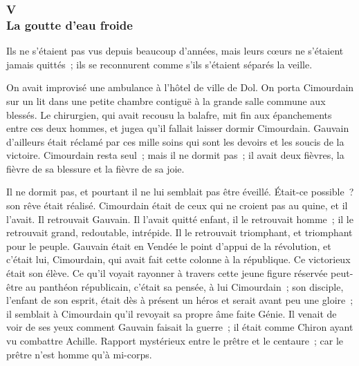 \documentclass[french,twoside]{book} %
\begin{document}
 \subsubsection[{V. La goutte d’eau froide}]{V \\
La goutte d’eau froide}
\label{p3l2c5}
\noindent Ils ne s’étaient pas vus depuis beaucoup d’années, mais leurs cœurs ne s’étaient jamais quittés ; ils se reconnurent comme s’ils s’étaient séparés la veille.\par
On avait improvisé une ambulance à l’hôtel de ville de Dol. On porta Cimourdain sur un lit dans une petite chambre contiguë à la grande salle commune aux blessés. Le chirurgien, qui avait recousu la balafre, mit fin aux épanchements entre ces deux hommes, et jugea qu’il fallait laisser dormir Cimourdain. Gauvain d’ailleurs était réclamé par ces mille soins qui sont les devoirs et les soucis de la victoire. Cimourdain resta seul ; mais il ne dormit pas ; il avait deux fièvres, la fièvre de sa blessure et la fièvre de sa joie.\par
Il ne dormit pas, et pourtant il ne lui semblait pas être éveillé. Était-ce possible ? son rêve était réalisé. Cimourdain était de ceux qui ne croient pas au quine, et il l’avait. Il retrouvait Gauvain. Il l’avait quitté enfant, il le retrouvait homme ; il le retrouvait grand, redoutable, intrépide. Il le retrouvait triomphant, et triomphant pour le peuple. Gauvain était en  Vendée le point d’appui de la révolution, et c’était lui, Cimourdain, qui avait fait cette colonne à la république. Ce victorieux était son élève. Ce qu’il voyait rayonner à travers cette jeune figure réservée peut-être au panthéon républicain, c’était sa pensée, à lui Cimourdain ; son disciple, l’enfant de son esprit, était dès à présent un héros et serait avant peu une gloire ; il semblait à Cimourdain qu’il revoyait sa propre âme faite Génie. Il venait de voir de ses yeux comment Gauvain faisait la guerre ; il était comme Chiron ayant vu combattre Achille. Rapport mystérieux entre le prêtre et le centaure ; car le prêtre n’est homme qu’à mi-corps.\par
\end{document}
